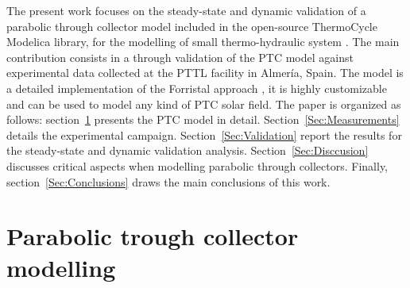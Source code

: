 \documentclass[final,3p,times,review]{elsarticle}
\begin{document}
The present work focuses on the steady-state and dynamic validation of a parabolic through collector model included in the open-source ThermoCycle Modelica library, for the modelling of small thermo-hydraulic system \cite{Quoilin2014a}. The main contribution consists in a through validation of the PTC model against experimental data collected at the PTTL facility in Almer\'ia, Spain. 
The model is a detailed implementation of the Forristal approach \citep{Forristal2003}, it is highly customizable and can be used to model any kind of PTC solar field.
The paper is organized as follows: section~\ref{Sec:DynModel} presents the PTC model in detail. Section~\ref{Sec:Measurements} details the experimental campaign. Section~\ref{Sec:Validation} report the results for the steady-state and dynamic validation analysis. Section~\ref{Sec:Disccusion} discusses critical aspects when modelling parabolic through collectors. Finally, section~\ref{Sec:Conclusions} draws the main conclusions of this work.
%
\section{Parabolic trough collector modelling}
\label{Sec:DynModel}
\end{document}
